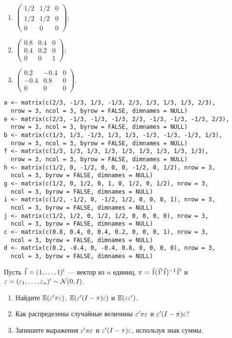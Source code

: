\begin{problem}
\begin{enumerate}
\item $\begin{pmatrix} 1/2 & 1/2 & 0 \\ 1/2 & 1/2 & 0 \\ 0 & 0 & 0 \end{pmatrix}$;
\item $\begin{pmatrix} 0.8 & 0.4 & 0 \\ 0.4 & 0.2 & 0 \\ 0 & 0 & 1 \end{pmatrix}$;
\item $\begin{pmatrix} 0.2 & -0.4 & 0 \\ -0.4 & 0.8 & 0 \\ 0 & 0 & 0 \end{pmatrix}$.
\end{enumerate}


\begin{sol}
\begin{verbatim}
a <- matrix(c(2/3, -1/3, 1/3, -1/3, 2/3, 1/3, 1/3, 1/3, 2/3),
  nrow = 3, ncol = 3, byrow = FALSE, dimnames = NULL)
e <- matrix(c(2/3, -1/3, -1/3, -1/3, 2/3, -1/3, -1/3, -1/3, 2/3),
  nrow = 3, ncol = 3, byrow = FALSE, dimnames = NULL)
b <- matrix(c(1/3, 1/3, -1/3, 1/3, 1/3, -1/3, -1/3, -1/3, 1/3),
  nrow = 3, ncol = 3, byrow = FALSE, dimnames = NULL)
f <- matrix(c(1/3, 1/3, 1/3, 1/3, 1/3, 1/3, 1/3, 1/3, 1/3),
  nrow = 3, ncol = 3, byrow = FALSE, dimnames = NULL)
h <- matrix(c(1/2, 0, -1/2, 0, 0, 0, -1/2, 0, 1/2), nrow = 3,
  ncol = 3, byrow = FALSE, dimnames = NULL)
g <- matrix(c(1/2, 0, 1/2, 0, 1, 0, 1/2, 0, 1/2), nrow = 3,
  ncol = 3, byrow = FALSE, dimnames = NULL)
i <- matrix(c(1/2, -1/2, 0, -1/2, 1/2, 0, 0, 0, 1), nrow = 3,
  ncol = 3, byrow = FALSE, dimnames = NULL)
j <- matrix(c(1/2, 1/2, 0, 1/2, 1/2, 0, 0, 0, 0), nrow = 3,
  ncol = 3, byrow = FALSE, dimnames = NULL)
c <- matrix(c(0.8, 0.4, 0, 0.4, 0.2, 0, 0, 0, 1), nrow = 3,
  ncol = 3, byrow = FALSE, dimnames = NULL)
d <- matrix(c(0.2, -0.4, 0, -0.4, 0.8, 0, 0, 0, 0), nrow = 3,
  ncol = 3, byrow = FALSE, dimnames = NULL)
\end{verbatim}
\end{sol}
\end{problem}


\begin{problem}
Пусть $\v1 = (1,\dots,1)'$ — вектор из $n$ единиц, $\pi=\v1(\v1'\v1)^{-1}\v1'$ и $\varepsilon = (\varepsilon_1,\dots,\varepsilon_n)'\sim \mathcal{N}(0,I)$.
\begin{enumerate}
\item Найдите $\mathbb{E}(\varepsilon'\pi\varepsilon)$, $\mathbb{E}(\varepsilon'(I-\pi)\varepsilon)$ и $\mathbb{E}(\varepsilon\varepsilon')$.
\item Как распределены случайные величины $\varepsilon'\pi\varepsilon$ и $\varepsilon'(I-\pi)\varepsilon$?
\item Запишите выражения $\varepsilon'\pi\varepsilon$ и $\varepsilon'(I-\pi)\varepsilon$, используя знак суммы.
\end{enumerate}



\begin{sol}
\end{sol}
\end{problem}



